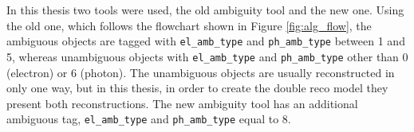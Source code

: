 \documentclass[a4paper, oneside, 11pt, openright]{book}
\begin{document}
		In this thesis two tools were used, the old ambiguity tool and the new one. Using the old one, which follows the flowchart shown in Figure \ref{fig:alg_flow}, the ambiguous objects are tagged with \texttt{el\_amb\_type} and \texttt{ph\_amb\_type} between 1 and 5, whereas unambiguous objects with \texttt{el\_amb\_type} and \texttt{ph\_amb\_type} other than 0 (electron) or 6 (photon). The unambiguous objects are usually reconstructed in only one way, but in this thesis, in order to create the double reco model they present both reconstructions. The new ambiguity tool has an additional ambiguous tag, \texttt{el\_amb\_type} and \texttt{ph\_amb\_type} equal to 8.
		
		
	
	\clearpage	
	\begin{thebibliography}{32}
			

\end{thebibliography}
\end{document}
